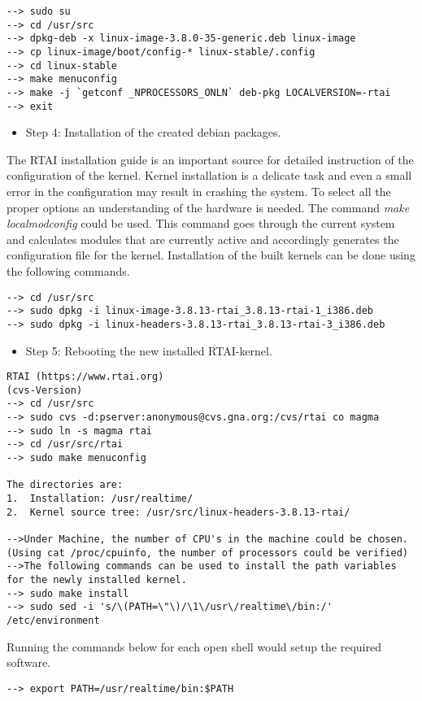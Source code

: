 \begin{lstlisting}
--> sudo su 
--> cd /usr/src 
--> dpkg-deb -x linux-image-3.8.0-35-generic.deb linux-image 
--> cp linux-image/boot/config-* linux-stable/.config 
--> cd linux-stable 
--> make menuconfig 
--> make -j `getconf _NPROCESSORS_ONLN` deb-pkg LOCALVERSION=-rtai 
--> exit 
\end{lstlisting}
\begin{itemize}
\item Step 4: Installation of the created debian packages.  
\end{itemize}
The RTAI installation guide is an important source for detailed instruction of the configuration of the kernel. Kernel installation is a delicate task and even a small error in the configuration may result in crashing the system. To select all the proper options an understanding of the hardware is needed. The command \textit{make localmodconfig} could be used. This command goes through the current system and calculates modules that are currently active and accordingly generates the configuration file for the kernel. Installation of the built kernels can be done using the following commands.
\begin{lstlisting}
--> cd /usr/src
--> sudo dpkg -i linux-image-3.8.13-rtai_3.8.13-rtai-1_i386.deb
--> sudo dpkg -i linux-headers-3.8.13-rtai_3.8.13-rtai-3_i386.deb
\end{lstlisting}
\begin{itemize}
\item Step 5: Rebooting the new installed RTAI-kernel.
\end{itemize}
\pagebreak
\begin{lstlisting}
RTAI (https://www.rtai.org)
(cvs-Version)
--> cd /usr/src 
--> sudo cvs -d:pserver:anonymous@cvs.gna.org:/cvs/rtai co magma
--> sudo ln -s magma rtai
--> cd /usr/src/rtai
--> sudo make menuconfig

The directories are:
1.	Installation: /usr/realtime/
2.	Kernel source tree: /usr/src/linux-headers-3.8.13-rtai/

-->Under Machine, the number of CPU's in the machine could be chosen.
(Using cat /proc/cpuinfo, the number of processors could be verified)
-->The following commands can be used to install the path variables for the newly installed kernel.
--> sudo make install
--> sudo sed -i 's/\(PATH=\"\)/\1\/usr\/realtime\/bin:/' /etc/environment
\end{lstlisting}
Running the commands below for each open shell would setup the required software. 
\begin{lstlisting}
--> export PATH=/usr/realtime/bin:$PATH 
\end{lstlisting}
